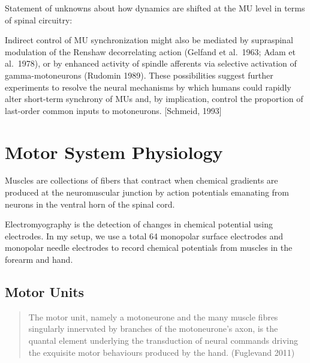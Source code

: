 {            Statement of unknowns about how dynamics are shifted at the
            MU level in terms of spinal circuitry:

            Indirect control of MU synchronization might also be
            mediated by supraspinal modulation of the Renshaw
            decorrelating action (Gelfand et al.~1963; Adam et
            al.~1978), or by enhanced activity of spindle afferents via
            selective activation of gamma-motoneurons (Rudomin 1989).
            These possibilities suggest further experiments to resolve
            the neural mechanisms by which humans could rapidly alter
            short-term synchrony of MUs and, by implication, control the
            proportion of last-order common inputs to motoneurons.
            {[}Schmeid, 1993{]}

            \hypertarget{motor-system-physiology}{%
            \section{Motor System
            Physiology}\label{motor-system-physiology}}

            Muscles are collections of fibers that contract when
            chemical gradients are produced at the neuromuscular
            junction by action potentials emanating from neurons in the
            ventral horn of the spinal cord.

            Electromyography is the detection of changes in chemical
            potential using electrodes. In my setup, we use a total 64
            monopolar surface electrodes and monopolar needle electrodes
            to record chemical potentials from muscles in the forearm
            and hand.

            \hypertarget{motor-units}{%
            \subsection{Motor Units}\label{motor-units}}

            \begin{quote}
            The motor unit, namely a motoneurone and the many muscle
            fibres singularly innervated by branches of the
            motoneurone's axon, is the quantal element underlying the
            transduction of neural commands driving the exquisite motor
            behaviours produced by the hand. (Fuglevand 2011)
            \end{quote}

}
